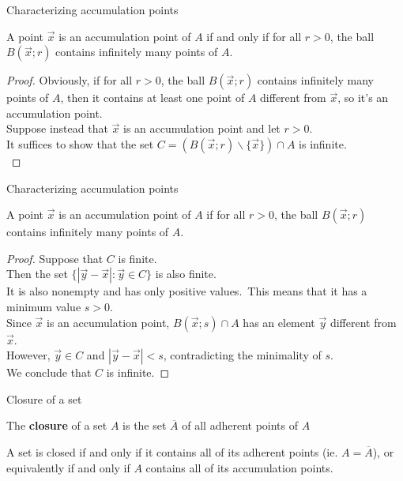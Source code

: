 \documentclass{beamer}
\begin{document}
\begin{frame}{Characterizing accumulation points}
\begin{thm}
A point $\vec x$ is an accumulation point of $A$ if and only if for all $r > 0$, the ball $B(\vec x; r)$ contains infinitely many points of $A$.
\end{thm}
\pause
\begin{proof}
\pause
Obviously, if for all $r > 0$, the ball $B(\vec x; r)$ contains infinitely many points of $A$, then it contains at least one point of $A$ different from $\vec x$, so it's an accumulation point.\\
\pause
Suppose instead that $\vec x$ is an accumulation point and let $r > 0$.\\
\pause
It suffices to show that the set $C = (B(\vec x; r)\backslash\{\vec x\})\cap A$ is infinite.\\
\end{proof}
\end{frame}

\begin{frame}{Characterizing accumulation points}
\begin{thm}
A point $\vec x$ is an accumulation point of $A$ if for all $r > 0$, the ball $B(\vec x; r)$ contains infinitely many points of $A$.
\end{thm}
\pause
\begin{proof}
\pause
Suppose that $C$ is finite.\\
\pause
Then the set $\{|\vec y - \vec x|: \vec y\in C\}$ is also finite.\\
\pause
It is also nonempty and has only positive values.\ \pause This means that it has a minimum value $s > 0$.\\
\pause
Since $\vec x$ is an accumulation point, $B(\vec x; s)\cap A$ has an element $\vec y$ different from $\vec x$.\\
\pause
However, $\vec y\in C$ and $|\vec y - \vec x| < s$, contradicting the minimality of $s$.\\
\pause
We conclude that $C$ is infinite.
\end{proof}
\end{frame}


\begin{frame}{Closure of a set}
\begin{defn}
The \textbf{closure} of a set $A$ is the set $\overline{A}$ of all adherent points of $A$
\end{defn}
\pause
\begin{thm}
A set is closed if and only if it contains all of its adherent points (ie. $A= \overline{A}$), or equivalently if and only if $A$ contains all of its accumulation points. 
\end{thm}
\end{frame}
\end{document}
